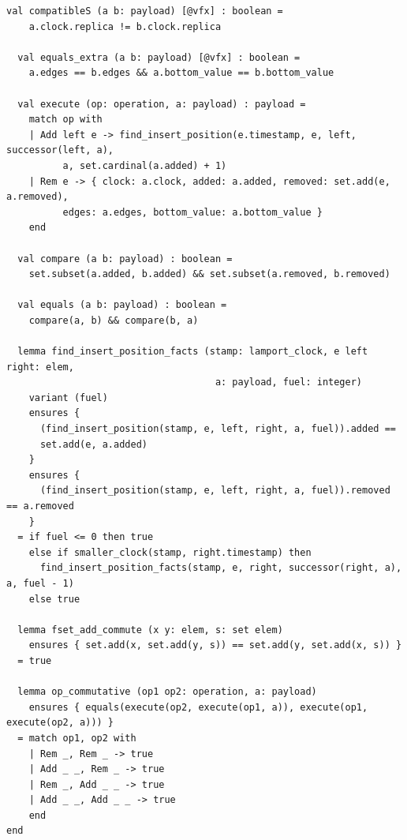 \begin{lstlisting}[caption={\texttt{RGA}}, label={lst:app_rga}]
  val compatibleS (a b: payload) [@vfx] : boolean =
    a.clock.replica != b.clock.replica

  val equals_extra (a b: payload) [@vfx] : boolean =
    a.edges == b.edges && a.bottom_value == b.bottom_value

  val execute (op: operation, a: payload) : payload =
    match op with
    | Add left e -> find_insert_position(e.timestamp, e, left, successor(left, a),
          a, set.cardinal(a.added) + 1)
    | Rem e -> { clock: a.clock, added: a.added, removed: set.add(e, a.removed),
          edges: a.edges, bottom_value: a.bottom_value }
    end

  val compare (a b: payload) : boolean =
    set.subset(a.added, b.added) && set.subset(a.removed, b.removed)

  val equals (a b: payload) : boolean =
    compare(a, b) && compare(b, a)

  lemma find_insert_position_facts (stamp: lamport_clock, e left right: elem,
                                     a: payload, fuel: integer)
    variant (fuel)
    ensures {
      (find_insert_position(stamp, e, left, right, a, fuel)).added ==
      set.add(e, a.added)
    }
    ensures {
      (find_insert_position(stamp, e, left, right, a, fuel)).removed == a.removed
    }
  = if fuel <= 0 then true
    else if smaller_clock(stamp, right.timestamp) then
      find_insert_position_facts(stamp, e, right, successor(right, a), a, fuel - 1)
    else true

  lemma fset_add_commute (x y: elem, s: set elem)
    ensures { set.add(x, set.add(y, s)) == set.add(y, set.add(x, s)) }
  = true

  lemma op_commutative (op1 op2: operation, a: payload)
    ensures { equals(execute(op2, execute(op1, a)), execute(op1, execute(op2, a))) }
  = match op1, op2 with
    | Rem _, Rem _ -> true
    | Add _ _, Rem _ -> true
    | Rem _, Add _ _ -> true
    | Add _ _, Add _ _ -> true
    end
end
\end{lstlisting}
